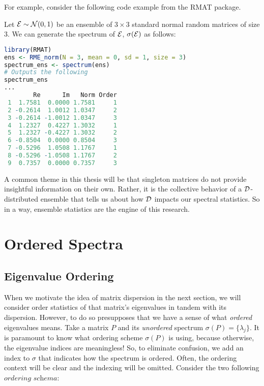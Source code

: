 \medskip
\noindent For example, consider the following code example from the RMAT package.
\begin{code}
Let $\mathcal{E} \sim \mathcal{N}(0,1)$ be an ensemble of $3 \times 3$ standard normal random matrices of size $3$. We can generate the spectrum of $\mathcal{E}$, $\sigma(\mathcal{E})$ as follows:
\end{code}

\begin{lstlisting}[language=R]
library(RMAT)
ens <- RME_norm(N = 3, mean = 0, sd = 1, size = 3)
spectrum_ens <- spectrum(ens)
# Outputs the following
spectrum_ens
...
        Re      Im   Norm Order
 1  1.7581  0.0000 1.7581     1
 2 -0.2614  1.0012 1.0347     2
 3 -0.2614 -1.0012 1.0347     3
 4  1.2327  0.4227 1.3032     1
 5  1.2327 -0.4227 1.3032     2
 6 -0.8504  0.0000 0.8504     3
 7 -0.5296  1.0508 1.1767     1
 8 -0.5296 -1.0508 1.1767     2
 9  0.7357  0.0000 0.7357     3
\end{lstlisting}

A common theme in this thesis will be that singleton matrices do not provide insightful information on their own. Rather, it is the collective behavior of a $\mathcal{D}$-distributed ensemble that tells us about how $\mathcal{D}$ impacts our spectral statistics. So in a way, ensemble statistics are the engine of this research.


\newpage
\section{Ordered Spectra}


\subsection{Eigenvalue Ordering}
When we motivate the idea of matrix dispersion in the next section, we will consider order statistics of that matrix's eigenvalues in tandem with its dispersion. However, to do so presupposes that we have a sense of what \textit{ordered} eigenvalues means. Take a matrix $P$ and its \textit{unordered} spectrum $\sigma(P) = \{\lambda_j\}$. It is paramount to know what ordering scheme $\sigma(P)$ is using, because otherwise, the eigenvalue indices are meaningless! So, to eliminate confusion, we add an index to $\sigma$ that indicates how the spectrum is ordered. Often, the ordering context will be clear and the indexing will be omitted. Consider the two following $\textit{ordering schema}$:

